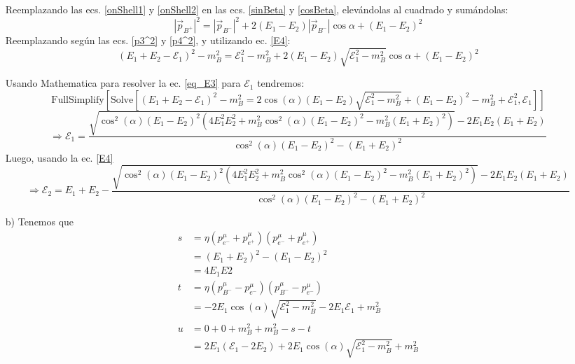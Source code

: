 \documentclass[]{article}
\numberwithin{equation}{section}
\newcommand{\0}{\textcolor{gray}{0}}
\begin{document}
\begin{enumerate}
	Reemplazando las ecs. \ref{onShell1} y \ref{onShell2} en las ecs. \ref{sinBeta} y \ref{cosBeta}, elevándolas al cuadrado y sumándolas:
	\begin{equation}
		|\vec{p}_{B^{+}}|^2 = |\vec{p}_{B^{-}}|^2 + 2(E_{1} - E_{2}) |\vec{p}_{B^{-}}| \cos\alpha + (E_{1} - E_{2})^2
	\end{equation}
	Reemplazando según las ecs. \ref{p3^2} y \ref{p4^2}, y utilizando ec. \ref{E4}:
	\begin{equation}
		(E_{1} + E_{2} -\mathcal{E}_{1} )^2 - m_{B}^2 = \mathcal{E}_{1}^2 - m_{B}^2 + 2(E_{1} - E_{2}) \sqrt{\mathcal{E}_{1}^2 - m_{B}^2} \cos\alpha + (E_{1} - E_{2})^2 \label{eq_E3}
	\end{equation}
	
	Usando Mathematica para resolver la ec. \ref{eq_E3} para \(\mathcal{E}_{1}\) tendremos:
	\begin{equation*}
		\text {FullSimplify}\left[\text{Solve}\left[(E_{1} + E_{2} - \mathcal {E}_{1})^2 - m_{B}^2 = 2\cos (\alpha) (E_{1} - E_{2})\sqrt{\mathcal {E}_{1}^2 - m_{B}^2} + (E_{1} - E_{2})^2 - m_{B}^2 + \mathcal {E}_{1}^2, \mathcal{E}_{1} \right] \right]
	\end{equation*}
	\begin{equation}
		\Rightarrow \mathcal{E}_{1} = \frac {\sqrt {\cos^2 (\alpha) (E_{1} - E_{2})^2\left (4E_{1}^2E_{2}^2 + m_{B}^2\cos^2 (\alpha) (E_{1} - E_{2})^2 - m_{B}^2 (E_{1} + E_{2})^2 \right)} - 2E_{1}E_{2} (E_{1} + E_{2})} {\cos^2 (\alpha) (E_{1} - E_{2})^2 - (E_{1} + E_{2})^2}
	\end{equation}
	Luego, usando la ec. \ref{E4}
	\begin{equation}
		\Rightarrow \mathcal{E}_{2} = E_{1} + E_{2} - \frac {\sqrt {\cos^2 (\alpha) (E_{1} - E_{2})^2\left (4E_{1}^2E_{2}^2 + m_{B}^2\cos^2 (\alpha) (E_{1} - E_{2})^2 - m_{B}^2 (E_{1} + E_{2})^2 \right)} - 2E_{1}E_{2} (E_{1} + E_{2})} {\cos^2 (\alpha) (E_{1} - E_{2})^2 - (E_{1} + E_{2})^2}
	\end{equation}
	
	\item[b)] Tenemos que
	\begin{align}
		s &= \eta (p^{\mu}_{e^{-}} + p^{\mu}_{e^{+}})(p^{\mu}_{e^{-}} + p^{\mu}_{e^{+}})\nonumber \\
		&= (E_{1} + E_{2})^2 - (E_{1} - E_{2})^2 \nonumber\\
		&= 4 E_{1} E{2}\\
		t &= \eta (p^{\mu}_{B^{-}} - p^{\mu}_{e^{-}})(p^{\mu}_{B^{-}} - p^{\mu}_{e^{-}})\nonumber \\
		&= -2E_{1}\cos (\alpha)\sqrt {\mathcal {E}_{1}^2 - m_{B}^2} - 2E_{1}\mathcal{E}_1 + m_{B}^2\\
		u &= 0 + 0 + m_{B}^2 + m_{B}^2 - s - t \nonumber\\
		&= 2E_{1} (\mathcal {E}_{1} - 2E_{2}) + 2E_{1}\cos (\alpha)\sqrt {\mathcal {E}_{1}^2 - m_{B}^2} + m_{B}^2
	\end{align}
\end{enumerate}
\end{document}
